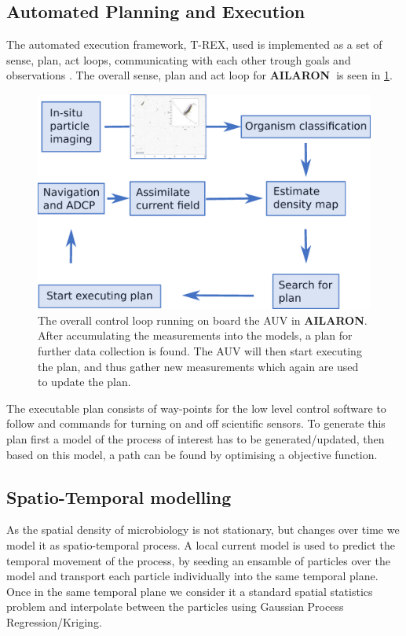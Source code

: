 \documentclass[conference]{IEEEtran}
\def\proj{{\textbf{AILARON\ }}}
\def\proje{{\textbf{AILARON}}}
\newcommand{\cmt}[1]{{\color{red}{#1}}}
\begin{document}
\subsection{Automated Planning and Execution}

The automated execution framework, T-REX, used is implemented as a set of sense, plan, act loops, communicating with each other trough goals and observations \cite{rajan12}.
The overall sense, plan and act loop for \proj is seen in \cref{fig:sensePlanActLoop}. 
\begin{figure}[tbp]
\centerline{\includegraphics[width=0.9\linewidth]{figures/workflow-simplified.eps}}
\caption{The overall control loop running on board the AUV in \proje. After accumulating the measurements into the models, a plan for further data collection is found. The AUV will then start executing the plan, and thus gather new measurements which again are used to update the plan.}
\label{fig:sensePlanActLoop}
\end{figure}
The executable plan consists of way-points for the low level control software to follow and commands for turning on and off scientific sensors.
To generate this plan first a model of the process of interest has to be generated/updated, then based on this model, a path can be found by optimising a objective function.

\subsection{Spatio-Temporal modelling}
As the spatial density of microbiology is not stationary, but changes over time we model it as spatio-temporal process. 
A local current model is used to predict the temporal movement of the process, by seeding an ensamble of particles over the model and transport each particle individually into the same temporal plane.
Once in the same temporal plane we consider it a standard spatial statistics problem and interpolate between the particles using Gaussian Process Regression/Kriging.
\end{document}
